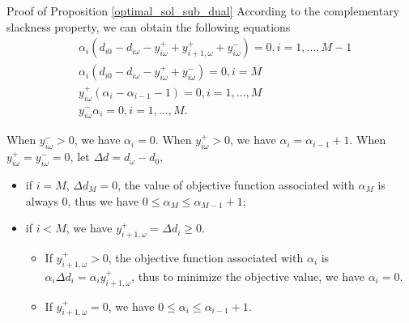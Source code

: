 \begin{pf}{Proof of Proposition \ref{optimal_sol_sub_dual}}
  According to the complementary slackness property, we can obtain the following equations
  \begin{align*}
    & \alpha_{i} (d_{i0} - d_{i \omega} - y_{i \omega}^{+} + y_{i+1, \omega}^{+} + y_{i \omega}^{-}) = 0, i =1,\ldots, M-1 \\
    & \alpha_{i} (d_{i0} - d_{i \omega} - y_{i \omega}^{+}+ y_{i \omega}^{-}) = 0, i = M \\
    & y_{i \omega}^{+}(\alpha_{i} - \alpha_{i-1}-1) = 0, i =1,\ldots, M \\
    & y_{i \omega}^{-} \alpha_{i} = 0, i =1,\ldots, M.
  \end{align*}
  

    When $y_{i \omega}^{-} >0$, we have $\alpha_{i} =0$. When $y_{i \omega}^{+} >0$, we have $\alpha_{i} = \alpha_{i-1} +1$. When $y_{i \omega}^{+} = y_{i \omega}^{-} = 0$, let $\Delta d = d_{\omega} - d_0$,
    \begin{itemize}
      \item if $i = M$, $\Delta d_{M} =0$, the value of objective function associated with $\alpha_{M}$ is always $0$, thus we have $0 \leq \alpha_{M} \leq \alpha_{M-1}+1$;
      \item if $i < M$, we have $y_{i+1, \omega}^{+} = \Delta d_{i} \geq 0$.
      \begin{itemize}
        \item If $y_{i+1, \omega}^{+} > 0$, the objective function associated with $\alpha_i$ is $\alpha_{i} \Delta d_{i} = \alpha_{i} y_{i+1, \omega}^{+}$, thus to minimize the objective value, we have $\alpha_i =0$.
        \item If $y_{i+1, \omega}^{+} = 0$, we have $0 \leq \alpha_{i} \leq \alpha_{i-1} +1$.
      \end{itemize}
    \end{itemize}
  \end{pf}

